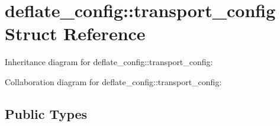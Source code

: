 \hypertarget{structdeflate__config_1_1transport__config}{}\section{deflate\+\_\+config\+:\+:transport\+\_\+config Struct Reference}
\label{structdeflate__config_1_1transport__config}


Inheritance diagram for deflate\+\_\+config\+:\+:transport\+\_\+config\+:


Collaboration diagram for deflate\+\_\+config\+:\+:transport\+\_\+config\+:
\subsection*{Public Types}
